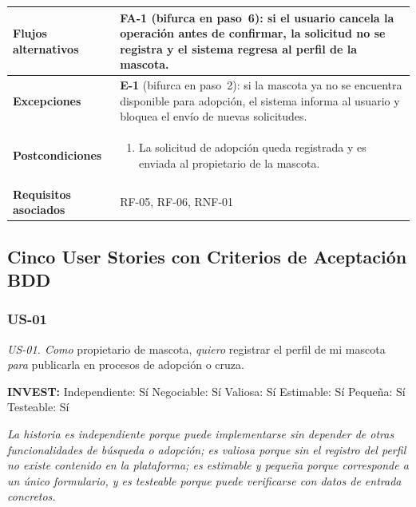 \documentclass[journal,onecolumn]{IEEEtran}
\begin{document}
\begin{table}[H]
\begin{tabularx}{\textwidth}{|l|X|}
\hline
\textbf{Flujos alternativos} & \textbf{FA-1} (bifurca en paso~6): si el usuario cancela la operación antes de confirmar, la solicitud no se registra y el sistema regresa al perfil de la mascota. \\
\hline
\textbf{Excepciones}         & \textbf{E-1} (bifurca en paso~2): si la mascota ya no se encuentra disponible para adopción, el sistema informa al usuario y bloquea el envío de nuevas solicitudes. \\
\hline
\textbf{Postcondiciones}     & \begin{enumerate}[leftmargin=*,topsep=0pt]
                                 \item La solicitud de adopción queda registrada y es enviada al propietario de la mascota.
                               \end{enumerate} \\
\hline
\textbf{Requisitos asociados} & RF-05, RF-06, RNF-01 \\
\hline
\end{tabularx}
\end{table}

\subsection{Cinco User Stories con Criterios de Aceptación BDD}

\subsubsection{US-01}

\begin{mdframed}[style=guia]
\textit{US-01. Como} propietario de mascota, \textit{quiero} registrar el
perfil de mi mascota \textit{para} publicarla en procesos de adopción o
cruza.
\end{mdframed}

\textbf{INVEST:} Independiente: Sí \quad Negociable: Sí \quad
Valiosa: Sí \quad Estimable: Sí \quad
Pequeña: Sí \quad Testeable: Sí

\textit{La historia es independiente porque puede implementarse sin
depender de otras funcionalidades de búsqueda o adopción; es valiosa
porque sin el registro del perfil no existe contenido en la plataforma; es
estimable y pequeña porque corresponde a un único formulario, y es
testeable porque puede verificarse con datos de entrada concretos.}
\end{document}
